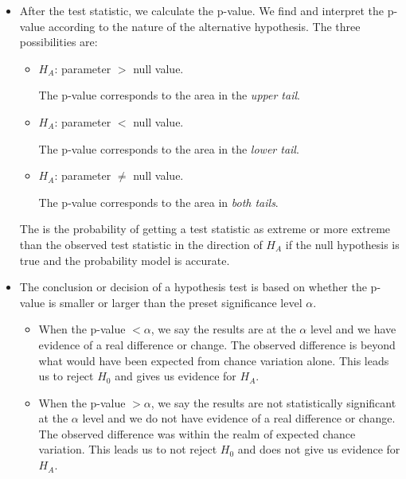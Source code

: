 \begin{itemize}
\item After the test statistic, we calculate the p-value.  We find and interpret the p-value according to the nature of the alternative hypothesis.  The three possibilities are:\vspace{-1mm}
\begin{itemize}
\item[] $H_A$: parameter $>$ null value. \quad\parbox[t]{3.84in}{The p-value corresponds to the area in the \emph{upper tail}.  }
\item[] $H_A$: parameter $<$ null value. \quad\parbox[t]{3.84in}{The p-value corresponds to the area in the \emph{lower tail}.  }
\item[] $H_A$: parameter $\ne$ null value. \quad\parbox[t]{3.84in}{The p-value corresponds to the area in \emph{both tails}.  }
\end{itemize}
The  is the probability of getting a test statistic as extreme or more extreme than the observed test statistic in the direction of $H_A$ if the null hypothesis is true and the probability model is accurate.

\item The conclusion or decision of a hypothesis test is based on whether the p-value is smaller or larger than the preset significance level $\alpha$. \vspace{-1mm}
\begin{itemize}
\item When the  p-value $< \alpha$, we say the results are  at the $\alpha$ level and we have evidence of a real difference or change.  The observed difference is beyond what would have been expected from chance variation alone.  This leads us to reject $H_0$ and gives us evidence for $H_A$.
\item When the  p-value $> \alpha$, we say the results are not statistically significant at the $\alpha$ level and we do not have evidence of a real difference or change.  The observed difference was within the realm of expected chance variation.  This leads us to not reject $H_0$ and does not give us evidence for $H_A$.
\end{itemize}

\D{\newpage}


\end{itemize}

